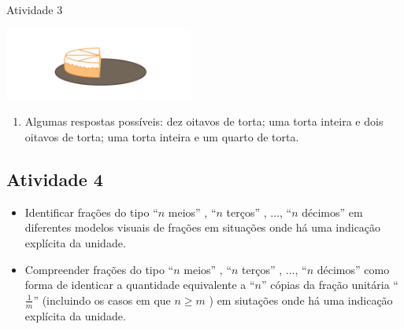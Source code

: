\begin{multicols}{2}
\begin{resposta*}{Atividade 3}
  \begin{center}
  \includegraphics[width=175pt, keepaspectratio]{..//media/cap2/secoes/pngs_licao_02/ativ3_resposta.png}
  \end{center}
  
\begin{enumerate} [\quad a)] %
    \item       Algumas respostas possíveis: dez oitavos de torta;  uma torta inteira e dois oitavos de torta; uma torta inteira e um quarto de torta.
\end{enumerate} %

\end{resposta*}



\subsection{Atividade 4}

   \vspace{.1cm}
  
\begin{itemize} %
    \item       Identificar frações do tipo       ``$n$ meios''      ,       ``$n$ terços''      , ...,       ``$n$ décimos''       em diferentes modelos visuais de frações em situações onde há uma indicação explícita da unidade.
    \item       Compreender frações do tipo       ``$n$ meios''      ,       ``$n$ terços''      , ...,       ``$n$ décimos''       como forma de identicar a quantidade equivalente a       ``$n$''       cópias da fração unitária       ``$\frac{1}{m}$''       (incluindo os casos em que       $n \geq m$      ) em siutações onde há uma indicação explícita da unidade.
\end{itemize} %


  \vspace{.1cm}
  
  \vspace{.1cm}


\end{multicols}

